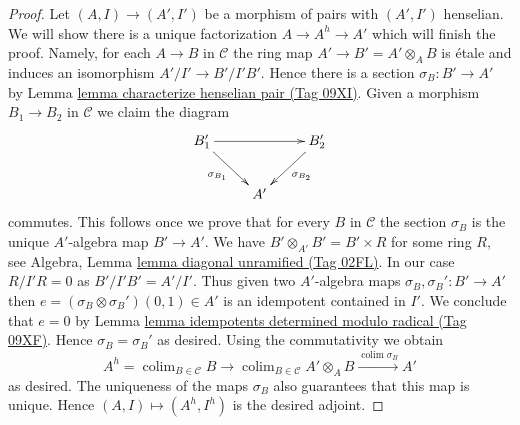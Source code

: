\documentclass{amsart}
\theoremstyle{plain}
\theoremstyle{definition}
\theoremstyle{remark}
\numberwithin{equation}{subsection}
\def\colim{\mathop{\mathrm{colim}}\nolimits}
\begin{document}
\begin{proof}
\medskip\noindent
Let $(A, I) \to (A', I')$ be a morphism of pairs with $(A', I')$ henselian.
We will show there is a unique factorization $A \to A^h \to A'$ which will
finish the proof. Namely, for each $A \to B$ in $\mathcal{C}$
the ring map $A' \to B' = A' \otimes_A B$ is \'etale and induces
an isomorphism $A'/I' \to B'/I'B'$. Hence there is a section
$\sigma_B : B' \to A'$ by Lemma \href{https://stacks.math.columbia.edu/tag/09XI}{lemma characterize henselian pair (Tag 09XI)}.
Given a morphism $B_1 \to B_2$ in $\mathcal{C}$ we claim the diagram
$$
\xymatrix{
B'_1 \ar[rr] \ar[rd]_{\sigma_{B_1}} & &
B'_2 \ar[ld]^{\sigma_{B_2}} \\
& A'
}
$$
commutes. This follows once we prove that for every $B$ in $\mathcal{C}$
the section $\sigma_B$ is the unique $A'$-algebra map $B' \to A'$.
We have $B' \otimes_{A'} B' = B' \times R$ for some ring $R$, see
Algebra, Lemma \href{https://stacks.math.columbia.edu/tag/02FL}{lemma diagonal unramified (Tag 02FL)}. In our case
$R/I'R = 0$ as $B'/I'B' = A'/I'$. Thus given two $A'$-algebra maps
$\sigma_B, \sigma_B' : B' \to A'$ then
$e = (\sigma_B \otimes \sigma_B')(0, 1) \in A'$
is an idempotent contained in $I'$. We conclude that $e = 0$
by Lemma \href{https://stacks.math.columbia.edu/tag/09XF}{lemma idempotents determined modulo radical (Tag 09XF)}.
Hence $\sigma_B = \sigma_B'$ as desired.
Using the commutativity we obtain
$$
A^h = \colim_{B \in \mathcal{C}} B \to
\colim_{B \in \mathcal{C}} A' \otimes_A B \xrightarrow{\colim \sigma_B} A'
$$
as desired. The uniqueness of the maps $\sigma_B$ also guarantees that
this map is unique. Hence $(A, I) \mapsto (A^h, I^h)$ is the desired adjoint.
\end{proof}
\end{document}
